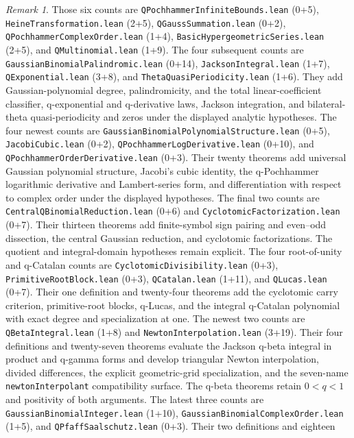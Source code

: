 \documentclass[11pt,oneside]{article}
\theoremstyle{definition}
\theoremstyle{remark}
\newtheorem{remark}[theorem]{Remark}
\begin{document}
\begin{remark}
Those six counts are \nolinkurl{QPochhammerInfiniteBounds.lean} (0+5),
\nolinkurl{HeineTransformation.lean} (2+5),
\nolinkurl{QGaussSummation.lean} (0+2),
\nolinkurl{QPochhammerComplexOrder.lean} (1+4),
\nolinkurl{BasicHypergeometricSeries.lean} (2+5), and
\nolinkurl{QMultinomial.lean} (1+9).
The four subsequent counts are
\nolinkurl{GaussianBinomialPalindromic.lean} (0+14),
\nolinkurl{JacksonIntegral.lean} (1+7),
\nolinkurl{QExponential.lean} (3+8), and
\nolinkurl{ThetaQuasiPeriodicity.lean} (1+6).  They add Gaussian-polynomial
degree, palindromicity, and the total linear-coefficient classifier,
q-exponential and q-derivative laws, Jackson
integration, and bilateral-theta quasi-periodicity and zeros under the
displayed analytic hypotheses.
The four newest counts are
\nolinkurl{GaussianBinomialPolynomialStructure.lean} (0+5),
\nolinkurl{JacobiCubic.lean} (0+2),
\nolinkurl{QPochhammerLogDerivative.lean} (0+10), and
\nolinkurl{QPochhammerOrderDerivative.lean} (0+3).  Their twenty theorems add
universal Gaussian polynomial structure, Jacobi's cubic identity, the
q-Pochhammer logarithmic derivative and Lambert-series form, and differentiation
with respect to complex order under the displayed hypotheses.
The final two counts are
\nolinkurl{CentralQBinomialReduction.lean} (0+6) and
\nolinkurl{CyclotomicFactorization.lean} (0+7).  Their thirteen theorems add
finite-symbol sign pairing and even--odd dissection, the central Gaussian
reduction, and cyclotomic factorizations.  The quotient and integral-domain
hypotheses remain explicit.
The four root-of-unity and q-Catalan counts are
\nolinkurl{CyclotomicDivisibility.lean} (0+3),
\nolinkurl{PrimitiveRootBlock.lean} (0+3),
\nolinkurl{QCatalan.lean} (1+11), and
\nolinkurl{QLucas.lean} (0+7).  Their one definition and twenty-four theorems
add the cyclotomic carry criterion, primitive-root blocks, q-Lucas, and the
integral q-Catalan polynomial with exact degree and specialization at one.
The newest two counts are
\nolinkurl{QBetaIntegral.lean} (1+8) and
\nolinkurl{NewtonInterpolation.lean} (3+19).  Their four definitions and
twenty-seven theorems evaluate the Jackson q-beta integral in product and
q-gamma forms and develop triangular Newton interpolation, divided
differences, the explicit geometric-grid specialization, and the seven-name
\nolinkurl{newtonInterpolant} compatibility surface.  The q-beta
theorems retain \(0<q<1\) and positivity of both arguments.
The latest three counts are
\nolinkurl{GaussianBinomialInteger.lean} (1+10),
\nolinkurl{GaussianBinomialComplexOrder.lean} (1+5), and
\nolinkurl{QPfaffSaalschutz.lean} (0+3).  Their two definitions and eighteen

\end{remark}
\end{document}
